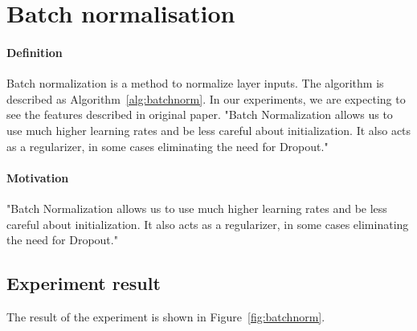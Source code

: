 \documentclass{article}
\begin{document}


\section{Batch normalisation}
\paragraph{Definition} Batch normalization \citep{DBLP:journals/corr/IoffeS15} is a method to normalize layer inputs.  The algorithm is described as Algorithm~\ref{alg:batchnorm}. In our experiments, we are expecting to see the features described in original paper. "Batch Normalization allows us to use much higher learning rates and be less careful about initialization. It also acts as a regularizer, in some cases eliminating the need for Dropout." \citep{DBLP:journals/corr/IoffeS15}

\paragraph{Motivation}
"Batch Normalization allows us to use much higher learning rates and be less careful about initialization. It also acts as a regularizer, in some cases eliminating the need for Dropout." \citep{DBLP:journals/corr/IoffeS15}



\subsection{Experiment result} 
The result of the experiment is shown in Figure~\ref{fig:batchnorm}.
\end{document}

